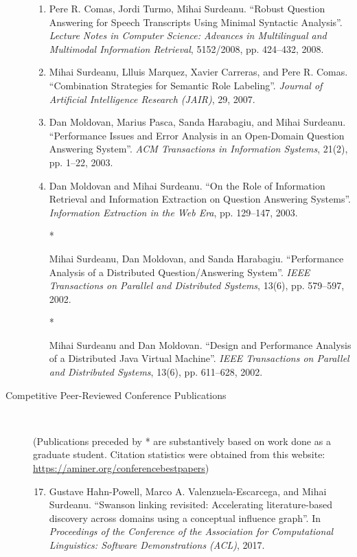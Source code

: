 \documentclass[10pt]{article}
\newcommand{\ve}[1]{{\em #1}} %
\newcommand{\ti}[1]{``#1''} %
\begin{document}
\begin{description}
\begin{enumerate}
\item
Pere R. Comas, Jordi Turmo, Mihai Surdeanu.  \ti{Robust Question Answering for Speech Transcripts Using Minimal Syntactic Analysis}. \ve{Lecture Notes in Computer Science: Advances in Multilingual and Multimodal Information Retrieval}, 5152/2008, pp. 424--432, 2008.

\item
Mihai Surdeanu, Llluis Marquez, Xavier Carreras, and Pere R. Comas.  \ti{Combination Strategies for Semantic Role Labeling}. \ve{Journal of Artificial Intelligence Research (JAIR)}, 29, 2007. 

\item
Dan Moldovan, Marius Pasca, Sanda Harabagiu, and Mihai Surdeanu.  \ti{Performance Issues and Error Analysis in an Open-Domain Question Answering System}. \ve{ACM Transactions in Information Systems}, 21(2), pp. 1--22, 2003.

\item
Dan Moldovan and Mihai Surdeanu.  \ti{On the Role of Information Retrieval and Information Extraction on Question Answering Systems}. \ve{Information Extraction in the Web Era}, pp. 129--147, 2003.

\item
[* \addtocounter{enumi}{1}\theenumi ]
Mihai Surdeanu, Dan Moldovan, and Sanda Harabagiu.  \ti{Performance Analysis of a Distributed Question/Answering System}. \ve{IEEE Transactions on Parallel and Distributed Systems}, 13(6), pp. 579--597, 2002. 

\item
[* \addtocounter{enumi}{1}\theenumi ]
Mihai Surdeanu and Dan Moldovan.  \ti{Design and Performance Analysis of a Distributed Java Virtual Machine}. \ve{IEEE Transactions on Parallel and Distributed Systems}, 13(6), pp. 611--628, 2002.

\end{enumerate}

\item [Competitive Peer-Reviewed Conference Publications]\

(Publications preceded by * are substantively based on work done as a graduate student. Citation statistics were obtained from this website: {\small \url{https://aminer.org/conferencebestpapers}})

\begin{enumerate}
\setcounter{enumi}{16}

\item
Gustave Hahn-Powell, Marco A. Valenzuela-Escarcega, and Mihai Surdeanu.   \ti{Swanson linking revisited: Accelerating literature-based discovery across domains using a conceptual influence graph}.   In \ve{Proceedings of the Conference of the Association for Computational Linguistics: Software Demonstrations (ACL)}, 2017.


\end{enumerate}
\end{description}
\end{document}

